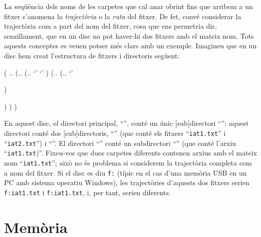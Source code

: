 La seqüència dels noms de les carpetes que cal anar obrint fins que
arribem a un fitxer s'anomena la \emph{trajectòria} o la \emph{ruta}
del fitxer.  De fet, convé considerar la trajectòria com a part del
nom del fitxer, cosa que ens permetria dir, senzillament, que en un
disc no pot haver-hi dos fitxers amb el mateix nom.
Tots aquests conceptes es veuen potser més clars amb un
exemple. Imagineu que en un disc hem creat l'estructura de fitxers i
directoris següent:
\begin{center}
\begin{parsetree}
    ( .{\carpeta{}}.
      (.{}.
         (.{}.  
               `' 
               `' 
      )
         (.{}. 
         (.{}. 
              `'
 
         ) 
         
         )
      )
    )
\end{parsetree}
\end{center}
En aquest disc, el directori principal, ``\carp{}'', conté un únic
[sub]directori ``''; aquest directori conté dos
[sub]directoris, ``'' (que conté els fitxers
``\texttt{iat1.txt}'' i ``\texttt{iat2.txt}'') i ``''.
El directori ``'' conté un subdirectori ``''
(que conté l'arxiu ``\texttt{iat1.txt})''. Fixeu-vos que dues carpetes
diferents contenen arxius amb el mateix nom ``\texttt{iat1.txt}'';
això no és problema si considerem la trajectòria completa com a nom
del fitxer. Si el disc es diu \texttt{f:} (típic en el cas
d'una memòria USB en un PC amb sistema operatiu Windows), les
trajectòries d'aquests dos fitxers serien
\texttt{f:}\carp{}\texttt{iat1.txt} i
\texttt{f:}\carp{}\texttt{iat1.txt},
i, per tant, serien diferents.






\section{Memòria}
\label{ss:memoria}

